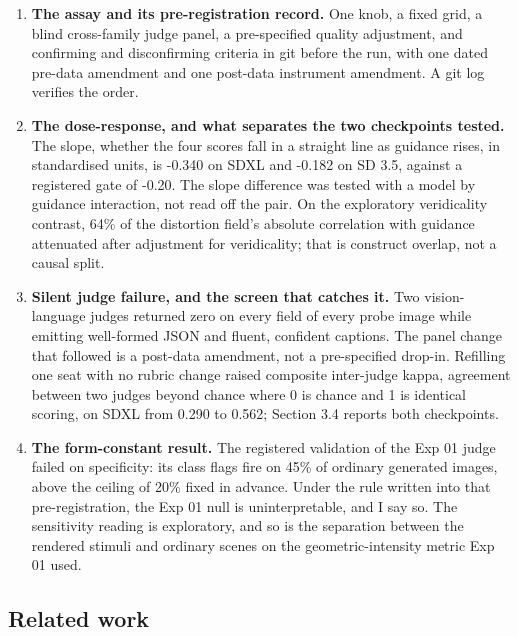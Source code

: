 \documentclass[11pt]{article}
\providecommand{\tightlist}{\setlength{\itemsep}{0pt}\setlength{\parskip}{0pt}}
\begin{document}
\begin{enumerate}
\def\labelenumi{\arabic{enumi}.}
\tightlist
\item
  \textbf{The assay and its pre-registration record.} One knob, a fixed grid, a
  blind cross-family judge panel, a pre-specified quality adjustment, and
  confirming and disconfirming criteria in git before the run, with one dated
  pre-data amendment and one post-data instrument amendment. A git log verifies
  the order.
\item
  \textbf{The dose-response, and what separates the two checkpoints tested.} The
  slope, whether the four scores fall in a straight line as guidance rises, in
  standardised units, is -0.340 on SDXL and -0.182 on SD 3.5, against a
  registered gate of -0.20. The slope difference was tested with a model by
  guidance interaction, not read off the pair. On the exploratory veridicality
  contrast, 64\% of the distortion field's absolute correlation with guidance
  attenuated after adjustment for veridicality; that is construct overlap, not a
  causal split.
\item
  \textbf{Silent judge failure, and the screen that catches it.} Two
  vision-language judges returned zero on every field of every probe image while
  emitting well-formed JSON and fluent, confident captions. The panel change
  that followed is a post-data amendment, not a pre-specified drop-in. Refilling
  one seat with no rubric change raised composite inter-judge kappa, agreement
  between two judges beyond chance where 0 is chance and 1 is identical scoring,
  on SDXL from 0.290 to 0.562; Section 3.4 reports both checkpoints.
\item
  \textbf{The form-constant result.} The registered validation of the Exp 01
  judge failed on specificity: its class flags fire on 45\% of ordinary
  generated images, above the ceiling of 20\% fixed in advance. Under the rule
  written into that pre-registration, the Exp 01 null is uninterpretable, and I
  say so. The sensitivity reading is exploratory, and so is the separation
  between the rendered stimuli and ordinary scenes on the geometric-intensity
  metric Exp 01 used.
\end{enumerate}

\subsection{Related work}\label{related-work}
\end{document}
